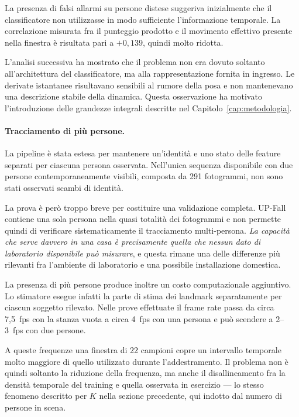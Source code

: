 La presenza di falsi allarmi su persone distese suggeriva inizialmente che il classificatore non utilizzasse in modo sufficiente l'informazione temporale. La correlazione misurata fra il punteggio prodotto e il movimento effettivo presente nella finestra è risultata pari a $+0{,}139$, quindi molto ridotta.

L'analisi successiva ha mostrato che il problema non era dovuto soltanto all'architettura del classificatore, ma alla rappresentazione fornita in ingresso. Le derivate istantanee risultavano sensibili al rumore della posa e non mantenevano una descrizione stabile della dinamica. Questa osservazione ha motivato l'introduzione delle grandezze integrali descritte nel Capitolo~\ref{cap:metodologia}.

\paragraph{Tracciamento di più persone.}

La pipeline è stata estesa per mantenere un'identità e uno stato delle feature separati per ciascuna persona osservata. Nell'unica sequenza disponibile con due persone contemporaneamente visibili, composta da 291 fotogrammi, non sono stati osservati scambi di identità.

La prova è però troppo breve per costituire una validazione completa. UP-Fall contiene una sola persona nella quasi totalità dei fotogrammi e non permette quindi di verificare sistematicamente il tracciamento multi-persona. \emph{La capacità che serve davvero in una casa è precisamente quella che nessun dato di laboratorio disponibile può misurare}, e questa rimane una delle differenze più rilevanti fra l'ambiente di laboratorio e una possibile installazione domestica.

La presenza di più persone produce inoltre un costo computazionale aggiuntivo. Lo stimatore esegue infatti la parte di stima dei landmark separatamente per ciascun soggetto rilevato. Nelle prove effettuate il frame rate passa da circa 7,5~fps con la stanza vuota a circa 4~fps con una persona e può scendere a 2--3~fps con due persone.

A queste frequenze una finestra di 22 campioni copre un intervallo temporale molto maggiore di quello utilizzato durante l'addestramento. Il problema non è quindi soltanto la riduzione della frequenza, ma anche il disallineamento fra la densità temporale del training e quella osservata in esercizio --- lo stesso fenomeno descritto per $K$ nella sezione precedente, qui indotto dal numero di persone in scena.

